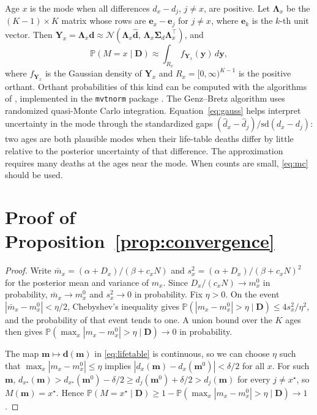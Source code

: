 \documentclass[12pt, letterpaper]{article}
\begin{document}
Age $x$ is the mode when all differences $d_x - d_j$, $j \neq x$, are positive. Let $\bm{\Lambda}_x$ be the $(K-1) \times K$ matrix whose rows are $\bm{e}_x - \bm{e}_j$ for $j \neq x$, where $\bm{e}_k$ is the $k$-th unit vector. Then $\bm{Y}_x = \bm{\Lambda}_x \bm{d} \approx \mathcal{N}(\bm{\Lambda}_x \hat{\bm{d}}, \, \bm{\Lambda}_x \bm{\Sigma}_d \bm{\Lambda}_x^\top)$, and
\begin{equation}
\mathbb{P}(M = x \mid \bm{D}) \approx \int_{R_x} f_{\bm{Y}_x}(\bm{y}) \, d\bm{y},
\label{eq:gauss}
\end{equation}
where $f_{\bm{Y}_x}$ is the Gaussian density of $\bm{Y}_x$ and $R_x = [0, \infty)^{K-1}$ is the positive orthant. Orthant probabilities of this kind can be computed with the algorithms of \citet{genz2009computation}, implemented in the \texttt{mvtnorm} package \citep{mi2009mvtnorm}. The Genz--Bretz algorithm uses randomized quasi-Monte Carlo integration. Equation~\eqref{eq:gauss} helps interpret uncertainty in the mode through the standardized gaps $(\hat d_x - \hat d_j)/\text{sd}(d_x - d_j)$: two ages are both plausible modes when their life-table deaths differ by little relative to the posterior uncertainty of that difference. The approximation requires many deaths at the ages near the mode. When counts are small, \eqref{eq:mc} should be used.

\section{Proof of Proposition~\ref{prop:convergence}}
\label{app:proof}

\begin{proof}
Write $\bar m_x = (\alpha + D_x)/(\beta + c_x N)$ and $s_x^2 = (\alpha + D_x)/(\beta + c_x N)^2$ for the posterior mean and variance of $m_x$. Since $D_x / (c_x N) \to m_x^0$ in probability, $\bar m_x \to m_x^0$ and $s_x^2 \to 0$ in probability. Fix $\eta > 0$. On the event $|\bar m_x - m_x^0| < \eta/2$, Chebyshev's inequality gives $\mathbb{P}(|m_x - m_x^0| > \eta \mid \bm{D}) \le 4 s_x^2 / \eta^2$, and the probability of that event tends to one. A union bound over the $K$ ages then gives $\mathbb{P}(\max_x |m_x - m_x^0| > \eta \mid \bm{D}) \to 0$ in probability.

The map $\bm{m} \mapsto \bm{d}(\bm{m})$ in \eqref{eq:lifetable} is continuous, so we can choose $\eta$ such that $\max_x |m_x - m_x^0| \le \eta$ implies $|d_x(\bm{m}) - d_x(\bm{m}^0)| < \delta/2$ for all $x$. For such $\bm{m}$, $d_{x^\star}(\bm{m}) > d_{x^\star}(\bm{m}^0) - \delta/2 \ge d_j(\bm{m}^0) + \delta/2 > d_j(\bm{m})$ for every $j \neq x^\star$, so $M(\bm{m}) = x^\star$. Hence $\mathbb{P}(M = x^\star \mid \bm{D}) \ge 1 - \mathbb{P}(\max_x |m_x - m_x^0| > \eta \mid \bm{D}) \to 1$.
\end{proof}
\end{document}
